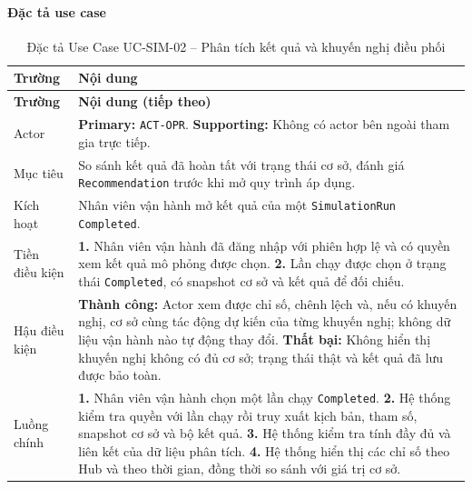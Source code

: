 \paragraph{Đặc tả use case}
\small
\begin{longtable}{|L{26mm}|L{118mm}|}
  \caption{Đặc tả Use Case UC-SIM-02 -- Phân tích kết quả và khuyến nghị điều phối}\label{tab:spec-UC-SIM-02}\\
  \hline
  \centering\arraybackslash\textbf{Trường} & \centering\arraybackslash\textbf{Nội dung}\\
  \hline
  \endfirsthead
  \hline
  \centering\arraybackslash\textbf{Trường} & \centering\arraybackslash\textbf{Nội dung (tiếp theo)}\\
  \hline
  \endhead
  Actor & \textbf{Primary:} \texttt{ACT-OPR}. \textbf{Supporting:} Không có actor bên ngoài tham gia trực tiếp.\\\hline
  Mục tiêu & So sánh kết quả đã hoàn tất với trạng thái cơ sở, đánh giá \texttt{Recommendation} trước khi mở quy trình áp dụng.\\\hline
  Kích hoạt & Nhân viên vận hành mở kết quả của một \texttt{SimulationRun} \texttt{Completed}.\\\hline
  Tiền điều kiện &
    \textbf{1.} Nhân viên vận hành đã đăng nhập với phiên hợp lệ và có quyền xem kết quả mô phỏng được chọn.\newline
    \textbf{2.} Lần chạy được chọn ở trạng thái \texttt{Completed}, có snapshot cơ sở và kết quả để đối chiếu.\\\hline
  Hậu điều kiện &
    \textbf{Thành công:} Actor xem được chỉ số, chênh lệch và, nếu có khuyến nghị, cơ sở cùng tác động dự kiến của từng khuyến nghị; không dữ liệu vận hành nào tự động thay đổi.\newline
    \textbf{Thất bại:} Không hiển thị khuyến nghị không có đủ cơ sở; trạng thái thật và kết quả đã lưu được bảo toàn.\\\hline
  Luồng chính &
    \textbf{1.} Nhân viên vận hành chọn một lần chạy \texttt{Completed}.\newline
    \textbf{2.} Hệ thống kiểm tra quyền với lần chạy rồi truy xuất kịch bản, tham số, snapshot cơ sở và bộ kết quả.\newline
    \textbf{3.} Hệ thống kiểm tra tính đầy đủ và liên kết của dữ liệu phân tích.\newline
    \textbf{4.} Hệ thống hiển thị các chỉ số theo Hub và theo thời gian, đồng thời so sánh với giá trị cơ sở.\newline

\end{longtable}
